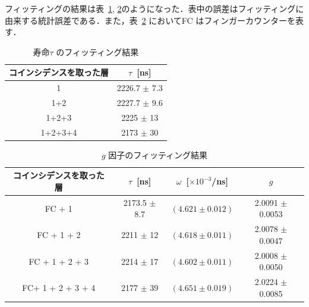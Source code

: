 フィッティングの結果は表~\ref{fit_lt}, \ref{fit_g}のようになった．表中の誤差はフィッティングに由来する統計誤差である．また，表~\ref{fit_g} においてFC はフィンガーカウンターを表す．
  
\begin{table}[H]
\caption{寿命$\tau$ のフィッティング結果}
\label{fit_lt}
\centering
\begin{tabular}{cc}\toprule
コインシデンスを取った層& $\tau$~[ns] \\ \midrule
1       & 2226.7 $\pm$ 7.3 \\
1+2     & 2227.7 $\pm$ 9.6\\
1+2+3   & 2225 $\pm$ 13 \\
1+2+3+4 & 2173 $\pm$ 30\\ \bottomrule
\end{tabular}
\end{table}%
  
\begin{table}[H]
\caption{$g$ 因子のフィッティング結果}
\label{fit_g}
\centering
\begin{tabular}{cccc}\toprule
コインシデンスを取った層 & $\tau$~[ns] & $\omega$~[$\times 10^{-3}$/ns] & $g$ \\ \midrule
FC + 1            & 2173.5 $\pm$ 8.7 & $ (4.621 \pm 0.012) $ & 2.0091 $\pm$ 0.0053 \\
FC + 1 + 2        & 2211   $\pm$ 12  & $ (4.618 \pm 0.011) $ & 2.0078 $\pm$ 0.0047 \\
FC + 1 + 2 + 3    & 2214   $\pm$ 17  & $ (4.602 \pm 0.011) $ & 2.0008 $\pm$ 0.0050\\
FC+ 1 + 2 + 3 + 4 & 2177   $\pm$ 39  & $ (4.651 \pm 0.019) $ & 2.0224 $\pm$ 0.0085 \\ \bottomrule
\end{tabular}
\end{table}%

